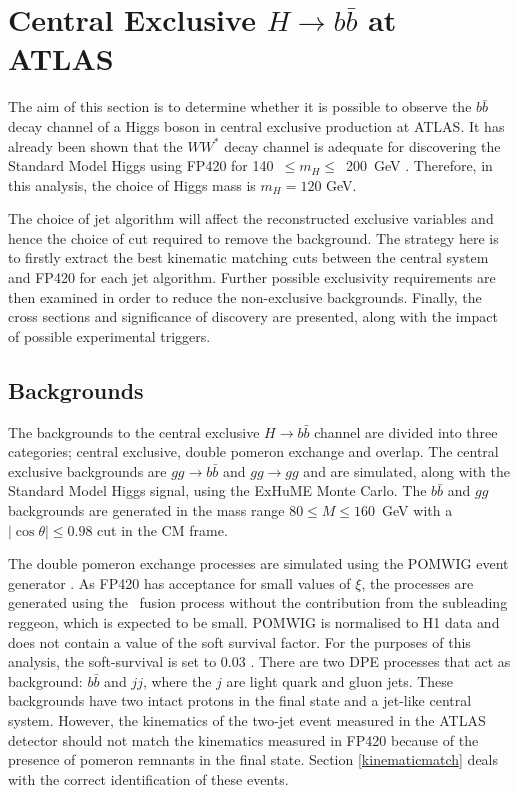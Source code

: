 \section{Central Exclusive $H \rightarrow b\bar{b}$ at ATLAS} 

The aim of this section is to determine whether it is possible to observe the $b\bar{b}$ decay channel of a Higgs boson in central exclusive production at ATLAS. It has already been shown that the $WW^{*}$ decay channel is adequate for discovering the Standard Model Higgs using FP420 for 140~$\leq m_H \leq$~200~GeV \cite{Cox:2005if}. Therefore, in this analysis, the choice of Higgs mass is $m_H = 120$ GeV.

The choice of jet algorithm will affect the reconstructed exclusive variables and hence the choice of cut required to remove the background. The strategy here is to firstly extract the best kinematic matching cuts between the central system and FP420 for each jet algorithm. Further possible exclusivity requirements are then examined in order to reduce the non-exclusive backgrounds. Finally, the cross sections and significance of discovery are presented, along with the impact of possible experimental triggers.

\subsection{Backgrounds}

The backgrounds to the central exclusive $H \rightarrow b\bar{b}$ channel are divided into three categories; central exclusive, double pomeron exchange and overlap. The central exclusive backgrounds are $gg\rightarrow b\bar{b}$ and $gg\rightarrow gg$ and are simulated, along with the Standard Model Higgs signal, using the ExHuME Monte Carlo. The $b\bar{b}$ and $gg$ backgrounds are generated in the mass range $80 \leq M \leq 160$~GeV with a $|\cos\theta| \leq 0.98$ cut in the CM frame. 


The double pomeron exchange processes are simulated using the POMWIG event generator \cite{Cox:2000jt}. As FP420 has acceptance for small values of $\xi$, the processes are generated using the \Pom \Pom \, fusion process without the contribution from the subleading reggeon, which is expected to be small.  POMWIG is normalised to H1 data \cite{Adloff:1997sc} and does not contain a value of the soft survival factor. For the purposes of this analysis, the soft-survival is set to 0.03 \cite{Alekhin:2005dx:Soft}. There are two DPE processes that act as background: $b\bar{b}$ and $jj$, where the $j$ are light quark and gluon jets. These backgrounds have two intact protons in the final state and a jet-like central system. However, the kinematics of the two-jet event measured in the ATLAS detector should not match the kinematics measured in FP420 because of the presence of pomeron remnants in the final state. Section \ref{kinematicmatch} deals with the correct identification of these events.

